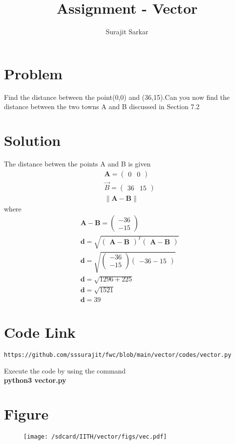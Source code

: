 \documentclass[journal,12pt,twocolumn]{IEEEtran}
\title{\mytitle}
\title{
Assignment - Vector
}
\author{Surajit Sarkar}
\newcommand{\myvec}[1]{\ensuremath{\begin{pmatrix}#1\end{pmatrix}}}
\providecommand{\norm}[1]{\lVert#1\rVert}
\let\vec\mathbf
\begin{document}
\maketitle
\tableofcontents
\bigskip
\section{\textbf{Problem}}
Find the distance between the point(0,0) and (36,15).Can you now find the distance between the two towns A and B discussed in Section 7.2
\section{\textbf{Solution}}
The distance betwen the points A and B is given
\begin{align*}
&\vec{A}=\myvec{0 & 0} \\ 
&\Vec{B}=\myvec{36 & 15} \\ 
&\norm{\vec{A}-\vec{B}}
\end{align*}
where
\begin{align*}
&\vec{A}-\vec{B}=\myvec{-36\\-15} \\
&\vec{d}=\sqrt{\myvec{\vec{A}-\vec{B}}^T\myvec{\vec{A}-\vec{B}}} \\
&\vec{d} =\sqrt{\myvec{-36\\-15}{\myvec{-36-15}}} \\
&\vec{d} =\sqrt{1296+225} \\
&\vec{d} =\sqrt{1521} \\
&\vec{d}= 39
\end{align*}
\section{\textbf{Code Link}}
\begin{lstlisting}
https://github.com/sssurajit/fwc/blob/main/vector/codes/vector.py
\end{lstlisting}
Execute the code by using the command\\
\textbf{python3 vector.py}
\section{\textbf{Figure}}
\begin{figure}[!h]
\centering
\texttt{[image: /sdcard/IITH/vector/figs/vec.pdf]}
\caption{}
\label{fig:vec}
\end{figure}
\end{document}
